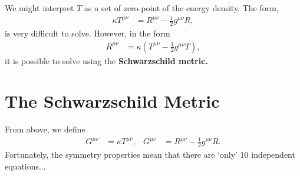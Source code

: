 \documentclass[a4paper, 11pt, normalem]{report}
\begin{document}
We might interpret $T$ as a set of zero-point of the energy density. 
The form, 
\begin{align}
    \kappa T^{\mu\nu} &= R^{\mu\nu} - \frac12g^{\mu\nu}R,
\end{align}
is very difficult to solve. 
However, in the form
\begin{align}
    R^{\mu\nu} &= \kappa\left(T^{\mu\nu} - \frac12g^{\mu\nu}T\right),
\end{align}
it is possible to solve using the \textbf{Schwarzschild metric.}

\section{The Schwarzschild Metric}
From above, we define
\begin{align}
    G^{\mu\nu} &= \kappa T^{\mu\nu}, & G^{\mu\nu} &= R^{\mu\nu} - \frac12g^{\mu\nu}R.
\end{align}
Fortunately, the symmetry properties mean that there are `only' 10 independent equations...
\end{document}
